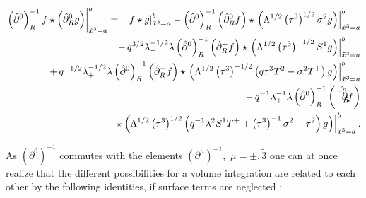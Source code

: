 \documentclass[a4paper,11pt,oneside]{article}
\begin{document}
\begin{eqnarray}
\left. \left( \hat{\partial}^{0}\right) _{R}^{-1}f\star \left( \hat{\partial}%
_{R}^{0}g\right) \right| _{\tilde{x}^{3}=a}^{b} &=&\left. f\star g\right| _{%
\tilde{x}^{3}=a}^{b}-\left( \hat{\partial}^{0}\right) _{R}^{-1}\left( \hat{%
\partial}_{R}^{0}f\right) \star \left. \left( \Lambda ^{1/2}\left( \tau
^{3}\right) ^{1/2}\sigma ^{2}g\right) \right| _{\tilde{x}^{3}=a}^{b} 
\nonumber \\
&&\hspace*{-2.9cm}-\,q^{3/2}\lambda _{+}^{-1/2}\lambda \left( \hat{\partial}%
^{0}\right) _{R}^{-1}\left( \hat{\partial}_{R}^{+}f\right) \star \left.
\left( \Lambda ^{1/2}\left( \tau ^{3}\right) ^{-1/2}S^{1}g\right) \right| _{%
\tilde{x}^{3}=a}^{b}  \nonumber \\
&&\hspace*{-2.9cm}+\,q^{-1/2}\lambda _{+}^{-1/2}\lambda \left( \hat{\partial}%
^{0}\right) _{R}^{-1}\left( \hat{\partial}_{R}^{-}f\right) \star \left.
\left( \Lambda ^{1/2}\left( \tau ^{3}\right) ^{-1/2}\left( q\tau
^{3}T^{2}-\sigma ^{2}T^{+}\right) g\right) \right| _{\tilde{x}^{3}=a}^{b} 
\nonumber \\
&&\hspace*{-2.9cm}-\,q^{-1}\lambda _{+}^{-1}\lambda \left( \hat{\partial}%
^{0}\right) _{R}^{-1}\left( \hat{\tilde{\partial}_{R}^{3}}f\right)  \nonumber
\\
&&\hspace*{-2.9cm}\star \left. \left( \Lambda ^{1/2}\left( \tau ^{3}\right)
^{1/2}\left( q^{-1}\lambda ^{2}S^{1}T^{+}+\left( \tau ^{3}\right)
^{-1}\sigma ^{2}-\tau ^{2}\right) g\right) \right| _{\tilde{x}^{3}=a}^{b}. 
\nonumber
\end{eqnarray}

As $\left( \partial ^{0}\right) ^{-1}$ commutes with the elements $\left( \partial ^{\mu}\right) ^{-1},$ $\mu=\pm ,\tilde{3}$ one can
at once realize that the different possibilities for a volume integration
are related to each other by the following identities, if surface terms are
neglected :
\end{document}

